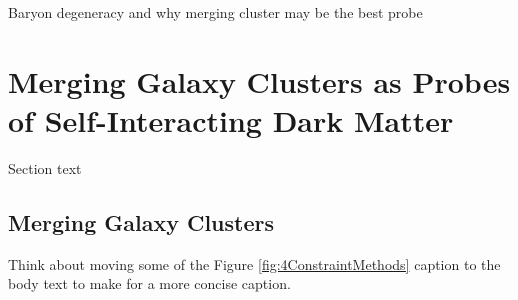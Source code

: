 Baryon degeneracy and why merging cluster may be the best probe

\section{Merging Galaxy Clusters as Probes of Self-Interacting Dark Matter}

Section text

\subsection{Merging Galaxy Clusters}\label{Section:MergingClusters}

Think about moving some of the Figure \ref{fig:4ConstraintMethods} caption to the body text to make for a more concise caption.

